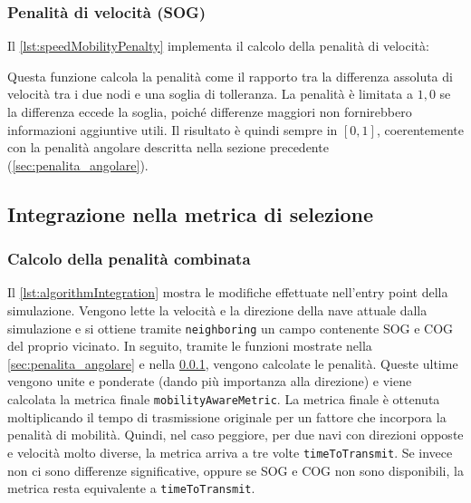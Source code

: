 \subsubsection{Penalità di velocità (SOG)}
\label{sec:penalita_velocita}

Il \cref{lst:speedMobilityPenalty} implementa il calcolo della penalità di velocità:



Questa funzione calcola la penalità come il rapporto tra la differenza assoluta di velocità tra i due nodi e una soglia di tolleranza. La penalità è limitata a $1{,}0$ se la differenza eccede la soglia, poiché differenze maggiori non fornirebbero informazioni aggiuntive utili. Il risultato è quindi sempre in $[0, 1]$, coerentemente con la penalità angolare descritta nella sezione precedente (\cref{sec:penalita_angolare}).

\subsection{Integrazione nella metrica di selezione}
\label{integrazione_metrica_selezione}

\subsubsection{Calcolo della penalità combinata}
\label{calcolo_penalita_combinata}

Il \cref{lst:algorithmIntegration} mostra le modifiche effettuate nell'entry point della simulazione. Vengono lette la velocità e la direzione della nave attuale dalla simulazione e si ottiene tramite \texttt{neighboring} un campo contenente \ac{SOG} e \ac{COG} del proprio vicinato. In seguito, tramite le funzioni mostrate nella \cref{sec:penalita_angolare} e nella \cref{sec:penalita_velocita}, vengono calcolate le penalità. Queste ultime vengono unite e ponderate (dando più importanza alla direzione) e viene calcolata la metrica finale \texttt{mobilityAwareMetric}. La metrica finale è ottenuta moltiplicando il tempo di trasmissione originale per un fattore che incorpora la penalità di mobilità. Quindi, nel caso peggiore, per due navi con direzioni opposte e velocità molto diverse, la metrica arriva a tre volte \texttt{timeToTransmit}. Se invece non ci sono differenze significative, oppure se \ac{SOG} e \ac{COG} non sono disponibili, la metrica resta equivalente a \texttt{timeToTransmit}.

